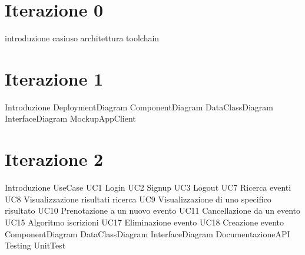 \documentclass[a4paper, 12pt]{book}
\begin{document}

\tableofcontents
\listoffigures

\chapter{Iterazione 0}
{introduzione}
\clearpage
{casiuso}
\clearpage
{architettura}
\clearpage
{toolchain}
\clearpage

\chapter{Iterazione 1}
\clearpage
{Introduzione}
\clearpage
{DeploymentDiagram}
\clearpage
{ComponentDiagram}
\clearpage
{DataClassDiagram}
\clearpage
{InterfaceDiagram}
\clearpage
{MockupAppClient}
\clearpage

\chapter{Iterazione 2}
{Introduzione}
\clearpage
{UseCase}
\clearpage
{UC1 Login}
\clearpage
{UC2 Signup}
\clearpage
{UC3 Logout}
\clearpage
{UC7 Ricerca eventi}
\clearpage
{UC8 Visualizzazione risultati ricerca}
\clearpage
{UC9 Visualizzazione di uno specifico risultato}
\clearpage
{UC10 Prenotazione a un nuovo evento}
\clearpage
{UC11 Cancellazione da un evento}
\clearpage
{UC15 Algoritmo iscrizioni}
\clearpage
{UC17 Eliminazione evento}
\clearpage
{UC18 Creazione evento}
\clearpage
{ComponentDiagram}
\clearpage
{DataClassDiagram}
\clearpage
{InterfaceDiagram}
\clearpage
{DocumentazioneAPI}
\clearpage
{Testing}
\clearpage
{UnitTest}
\clearpage
\end{document}
